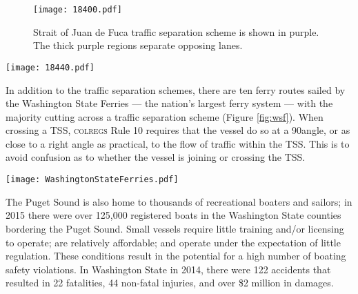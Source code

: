 \documentclass[twoside,symmetric,notoc]{tufte-book}
\begin{document}
\begin{figure}
    \centering
    \texttt{[image: 18400.pdf]}
    \caption{Strait of Juan de Fuca traffic separation scheme is shown in purple. The thick purple regions separate opposing lanes.}
    \label{fig:straitTSS}
\end{figure}
\begin{figure*}
    \centering
    \texttt{[image: 18440.pdf]}
    \caption{Puget Sound traffic separation scheme is shown in purple. The thick purple regions separate opposing lanes.}
    \label{fig:psTSS}
\end{figure*}
\par{%
In addition to the traffic separation schemes, there are ten ferry routes sailed by the Washington State Ferries --- the nation's largest ferry system --- with the majority cutting across a traffic separation scheme (Figure \ref{fig:wsf}).\cite{wsf} When crossing a TSS, \textsc{colregs} Rule 10 requires that the vessel do so at a 90\textdegree angle, or as close to a right angle as practical, to the flow of traffic within the TSS.\cite{USCG} This is to avoid confusion as to whether the vessel is joining or crossing the TSS.
}
\begin{figure*}
    \centering
    \texttt{[image: WashingtonStateFerries.pdf]}
    \vspace{-0.3in}
    \caption[The majority of Washington State Ferry routes cross a TSS.]{The majority of Washington State Ferry routes cross a TSS. WSDOT. (2010).}
    \label{fig:wsf}
\end{figure*}
\par{%
The Puget Sound is also home to thousands of recreational boaters and sailors; in 2015 there were over 125,000 registered boats in the Washington State counties bordering the Puget Sound. Small vessels require little training and/or licensing to operate; are relatively affordable; and operate under the expectation of little regulation. These conditions result in the potential for a high number of boating safety violations. In Washington State in 2014, there were 122 accidents that resulted in 22 fatalities, 44 non-fatal injuries, and over \$2 million in damages. 
}
\par{%


}
\end{document}
